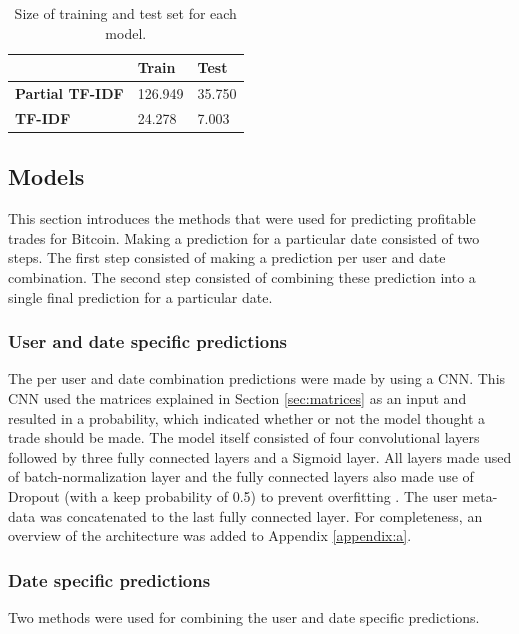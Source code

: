 \documentclass[sigconf]{acmart-txmm}
\begin{document}
\begin{table}[H]
\centering
\caption{Size of training and test set for each model.}
\label{table:n_matrices}
\begin{tabular}{@{}lll@{}}
 & \textbf{Train} & \textbf{Test} \\
\toprule
\textbf{Partial TF-IDF} & 126.949 & 35.750 \\
\textbf{TF-IDF} & 24.278 & 7.003 \\ 
\bottomrule
\end{tabular}%
\end{table}

\subsection{Models}
This section introduces the methods that were used for predicting profitable trades for Bitcoin. Making a prediction for a particular date consisted of two steps. The first step consisted of making a prediction per user and date combination. The second step consisted of combining these prediction into a single final prediction for a particular date.

\subsubsection{User and date specific predictions}
The per user and date combination predictions were made by using a CNN. This CNN used the matrices explained in Section \ref{sec:matrices} as an input and resulted in a probability, which indicated whether or not the model thought a trade should be made. The model itself consisted of four convolutional layers followed by three fully connected layers and a Sigmoid layer. All layers made used of batch-normalization layer and the fully connected layers also made use of Dropout (with a keep probability of 0.5) to prevent overfitting \cite{srivastava2014dropout} \cite{ioffe2015batch}. The user meta-data was concatenated to the last fully connected layer. For completeness, an overview of the architecture was added to Appendix \ref{appendix:a}.

\subsubsection{Date specific predictions}
Two methods were used for combining the user and date specific predictions. 
\end{document}
